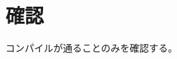 \documentclass[paper]{ieicej}
\begin{document}
\maketitle
\begin{abstract}
ieicej.cls のコンパイル確認。
\end{abstract}
\section{確認}
コンパイルが通ることのみを確認する。
\end{document}
